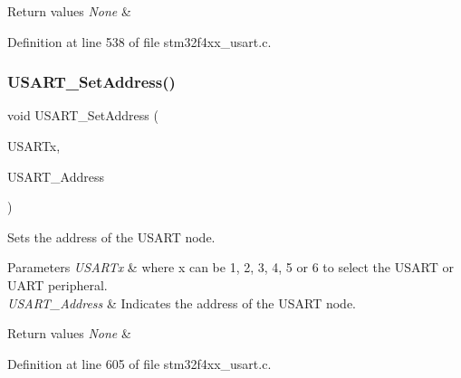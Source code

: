\begin{DoxyRetVals}{Return values}
{\em None} & \\
\hline
\end{DoxyRetVals}


Definition at line 538 of file stm32f4xx\+\_\+usart.\+c.

\mbox{\label{group___u_s_a_r_t_ga65ec9928817f3f031dd9a4dfc95d6666}} 
\subsubsection{\texorpdfstring{U\+S\+A\+R\+T\+\_\+\+Set\+Address()}{USART\_SetAddress()}}
{\footnotesize\ttfamily void U\+S\+A\+R\+T\+\_\+\+Set\+Address (\begin{DoxyParamCaption}\item[{\hyperlink{struct_u_s_a_r_t___type_def}{U\+S\+A\+R\+T\+\_\+\+Type\+Def} $\ast$}]{U\+S\+A\+R\+Tx,  }\item[{uint8\+\_\+t}]{U\+S\+A\+R\+T\+\_\+\+Address }\end{DoxyParamCaption})}



Sets the address of the U\+S\+A\+RT node. 


\begin{DoxyParams}{Parameters}
{\em U\+S\+A\+R\+Tx} & where x can be 1, 2, 3, 4, 5 or 6 to select the U\+S\+A\+RT or U\+A\+RT peripheral. \\
\hline
{\em U\+S\+A\+R\+T\+\_\+\+Address} & Indicates the address of the U\+S\+A\+RT node. \\
\hline
\end{DoxyParams}

\begin{DoxyRetVals}{Return values}
{\em None} & \\
\hline
\end{DoxyRetVals}


Definition at line 605 of file stm32f4xx\+\_\+usart.\+c.

\mbox{\label{group___u_s_a_r_t_gac4a35c6acd71ae7e0d67c1f03f0a8777}} 
